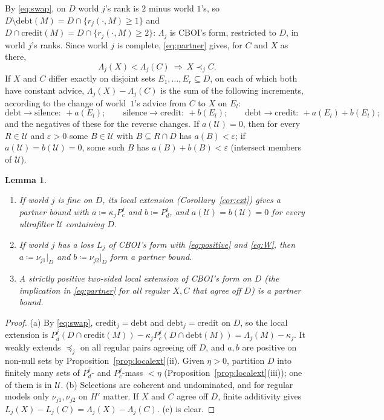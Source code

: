 \documentclass[11pt]{article}
\newtheorem{lemma}[theorem]{Lemma}
\theoremstyle{definition}\newtheorem{definition}[theorem]{Definition}
\theoremstyle{remark}\newtheorem{remark}[theorem]{Remark}
\newcommand{\debt}{\mathrm{debt}}
\newcommand{\cred}{\mathrm{credit}}
\newcommand{\sil}{\mathrm{silence}}
\newcommand{\Uf}{\mathcal U}
\begin{document}
By \eqref{eq:swap}, on $D$ world $j$'s rank is $2$ minus world $1$'s, so
$D\setminus\debt(M)=D\cap\{r_j(\cdot,M)\ge1\}$ and
$D\cap\cred(M)=D\cap\{r_j(\cdot,M)\ge2\}$: $\Lambda_j$ is CBOI's form,
restricted to $D$, in world $j$'s ranks. Since world $j$ is complete,
\eqref{eq:partner} gives, for $C$ and $X$ as there,
\begin{equation}
 \Lambda_j(X)<\Lambda_j(C)\ \Longrightarrow\ X\prec_jC.
 \label{eq:partnerstrict}
\end{equation}
If $X$ and $C$ differ exactly on disjoint sets $E_1,\dots,E_r\subseteq D$, on
each of which both have constant advice, $\Lambda_j(X)-\Lambda_j(C)$ is the
sum of the following increments, according to the change of world~$1$'s
advice from $C$ to $X$ on $E_l$:
\begin{equation}
 \debt\to\sil:\ +a(E_l);\qquad\sil\to\cred:\ +b(E_l);\qquad
 \debt\to\cred:\ +a(E_l)+b(E_l);
 \label{eq:incr}
\end{equation}
and the negatives of these for the reverse changes. If $a(\Uf)=0$, then for
every $R\in\Uf$ and $\varepsilon>0$ some $B\in\Uf$ with $B\subseteq R\cap D$
has $a(B)<\varepsilon$; if $a(\Uf)=b(\Uf)=0$, some such $B$ has
$a(B)+b(B)<\varepsilon$ (intersect members of $\Uf$).

\begin{lemma}\label{lem:sources}
\begin{enumerate}[label=(\alph*)]
\item If world $j$ is fine on $D$, its local extension (Corollary~\ref{cor:ext})
gives a partner bound with $a\coloneqq\kappa_jP^j_c$ and $b\coloneqq P^j_d$,
and $a(\Uf)=b(\Uf)=0$ for every ultrafilter $\Uf$ containing $D$.
\item If world $j$ has a loss $L_j$ of CBOI's form with
\eqref{eq:positive} and \eqref{eq:W}, then $a\coloneqq\nu_{j1}|_D$ and
$b\coloneqq\nu_{j2}|_D$ form a partner bound.
\item A strictly positive two-sided local extension of CBOI's form on $D$
(the implication in \eqref{eq:partner} for all regular $X,C$ that agree off
$D$) is a partner bound.
\end{enumerate}
\end{lemma}
\begin{proof}
(a) By \eqref{eq:swap}, $\cred_j=\debt$ and $\debt_j=\cred$ on $D$, so the
local extension is $P^j_d(D\cap\cred(M))-\kappa_jP^j_c(D\cap\debt(M))
=\Lambda_j(M)-\kappa_j$. It weakly extends $\preceq_j$ on all regular pairs
agreeing off $D$, and $a,b$ are positive on non-null sets by
Proposition~\ref{prop:localext}(ii). Given $\eta>0$, partition $D$ into
finitely many sets of $P^j_d$- and $P^j_c$-mass $<\eta$
(Proposition~\ref{prop:localext}(iii)); one of them is in $\Uf$. (b)
Selections are coherent and undominated, and for regular models only
$\nu_{j1},\nu_{j2}$ on $H'$ matter. If $X$ and $C$ agree off $D$, finite
additivity gives $L_j(X)-L_j(C)=\Lambda_j(X)-\Lambda_j(C)$. (c) is clear.
\end{proof}
\end{document}
